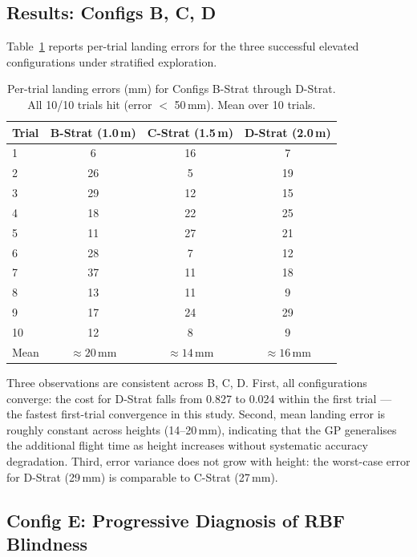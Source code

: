\subsection{Results: Configs B, C, D}
\label{sec:study1:results_bcd}

Table~\ref{tab:bcd_errors} reports per-trial landing errors for the three successful
elevated configurations under stratified exploration.

\begin{table}[t]
  \centering
  \caption{Per-trial landing errors (mm) for Configs B-Strat through D-Strat.
           All 10/10 trials hit (error $<$ 50\,mm). Mean over 10 trials.}
  \label{tab:bcd_errors}
  \small
  \begin{tabular}{lccc}
    \toprule
    Trial & B-Strat (1.0\,m) & C-Strat (1.5\,m) & D-Strat (2.0\,m) \\
    \midrule
    1  & 6  & 16 & 7  \\
    2  & 26 & 5  & 19 \\
    3  & 29 & 12 & 15 \\
    4  & 18 & 22 & 25 \\
    5  & 11 & 27 & 21 \\
    6  & 28 & 7  & 12 \\
    7  & 37 & 11 & 18 \\
    8  & 13 & 11 & 9  \\
    9  & 17 & 24 & 29 \\
    10 & 12 & 8  & 9  \\
    \midrule
    Mean & $\approx 20$\,mm & $\approx 14$\,mm & $\approx 16$\,mm \\
    \bottomrule
  \end{tabular}
\end{table}

Three observations are consistent across B, C, D.
First, all configurations converge: the cost for D-Strat falls from 0.827 to 0.024
within the first trial --- the fastest first-trial convergence in this study.
Second, mean landing error is roughly constant across heights (14--20\,mm), indicating
that the GP generalises the additional flight time as height increases without
systematic accuracy degradation.
Third, error variance does not grow with height: the worst-case error for D-Strat
(29\,mm) is comparable to C-Strat (27\,mm).

\subsection{Config E: Progressive Diagnosis of RBF Blindness}
\label{sec:study1:config_e}

